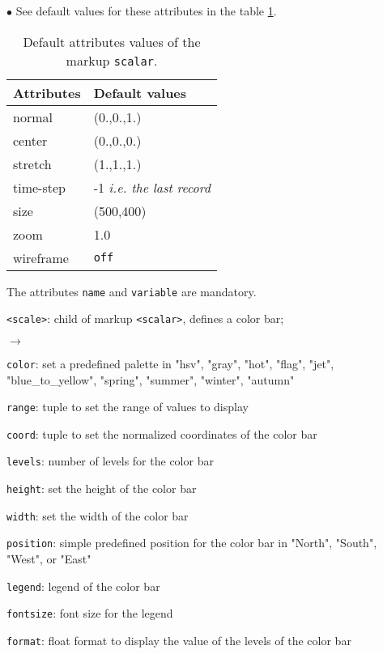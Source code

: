\documentclass[a4paper,10pt,twoside]{csshortdoc}
\begin{document}
\begin{list}{$\bullet$}{}
See default values for these attributes in the table \ref{table:scalar}.

\begin{table}[htbp]
\begin{center}
\begin{tabular}{|l|l|}
\hline
\textbf{Attributes} & \textbf{Default values} \\
\hline
normal & (0.,0.,1.) \\
center & (0.,0.,0.) \\
stretch & (1.,1.,1.) \\
time-step & -1 \textit{i.e. the last record} \\
size & (500,400) \\
zoom & 1.0 \\
wireframe & \texttt{off} \\
\hline
\end{tabular}
\end{center}
\caption{Default attributes values of the markup \texttt{scalar}.}
\label{table:scalar}
\end{table}

The attributes \texttt{name} and \texttt{variable} are mandatory.


\item \texttt{<scale>}: child of markup \texttt{<scalar>}, defines a color bar;
\begin{list}{$\rightarrow$}{}
\item \texttt{color}: set a predefined palette in "hsv", "gray", "hot", "flag", "jet", "blue\_to\_yellow", "spring", "summer", "winter", "autumn"
\item \texttt{range}: tuple to set the range of values to display
\item \texttt{coord}: tuple to set the normalized coordinates of the color bar
\item \texttt{levels}: number of levels for the color bar
\item \texttt{height}: set the height  of the color bar
\item \texttt{width}: set the width  of the color bar
\item \texttt{position}: simple predefined position for the color bar in "North", "South", "West", or "East"
\item \texttt{legend}: legend of the color bar
\item \texttt{fontsize}: font size for the legend
\item \texttt{format}: float format to display the value of the levels of the color bar
\end{list}


\end{list}
\end{document}
